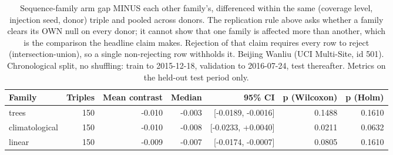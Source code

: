 \begin{table}[htbp]
\caption{Sequence-family arm gap MINUS each other family's, differenced within the same (coverage level, injection seed, donor) triple and pooled across donors. The replication rule above asks whether a family clears its OWN null on every donor; it cannot show that one family is affected more than another, which is the comparison the headline claim makes. Rejection of that claim requires every row to reject (intersection-union), so a single non-rejecting row withholds it. Beijing Wanliu (UCI Multi-Site, id 501). Chronological split, no shuffling: train to 2015-12-18, validation to 2016-07-24, test thereafter. Metrics on the held-out test period only.}
\label{tab:donor_family_contrasts}
\begin{tabular}{lrrrrrr}
\toprule
Family & Triples & Mean contrast & Median & 95\% CI & p (Wilcoxon) & p (Holm) \\
\midrule
trees & 150 & -0.010 & -0.003 & [-0.0189, -0.0016] & 0.1488 & 0.1610 \\
climatological & 150 & -0.010 & -0.008 & [-0.0233, +0.0040] & 0.0211 & 0.0632 \\
linear & 150 & -0.009 & -0.007 & [-0.0174, -0.0007] & 0.0805 & 0.1610 \\
\bottomrule
\end{tabular}
\end{table}
